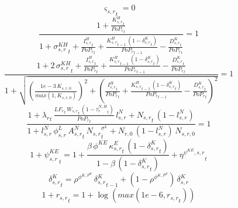 \begin{dmath}
{{\varsigma_{s,r}}}_{t}=0
\end{dmath}
\noindent[name= `LOM capital 4 1']
\begin{dmath}
\frac{1+\frac{{{K^H_{s,r}}}_{t}}{{{PoP_r}}_{t}}}{1+{{\sigma^{KH}_{s,r}}}_{t}+\frac{{{I^H_{s,r}}}_{t}}{{{PoP_r}}_{t}}+\frac{{{K^H_{s,r}}}_{t-1}\, \left(1-{{\delta^{K}_{s,r}}}_{t}\right)}{{{PoP_r}}_{t-1}}-\frac{{{D^K_{s,r}}}_{t}}{{{PoP_r}}_{t}}}=1
\end{dmath}
\noindent[name= `Capital non-negativity slack 4 1']
\begin{dmath}
\frac{1+2\, {{\sigma^{KH}_{s,r}}}_{t}+\frac{{{I^H_{s,r}}}_{t}}{{{PoP_r}}_{t}}+\frac{{{K^H_{s,r}}}_{t-1}\, \left(1-{{\delta^{K}_{s,r}}}_{t}\right)}{{{PoP_r}}_{t-1}}-\frac{{{D^K_{s,r}}}_{t}}{{{PoP_r}}_{t}}}{1+\sqrt{\left(\frac{1e-3\, {{K_{s,r,0}}}}{max(1,{{K_{s,r,0}}})}\right)^{2}+\left(\frac{{{I^H_{s,r}}}_{t}}{{{PoP_r}}_{t}}+\frac{{{K^H_{s,r}}}_{t-1}\, \left(1-{{\delta^{K}_{s,r}}}_{t}\right)}{{{PoP_r}}_{t-1}}-\frac{{{D^K_{s,r}}}_{t}}{{{PoP_r}}_{t}}\right)^{2}}}=1
\end{dmath}
\noindent[name= `FOC labour supply 4 1']
\begin{dmath}
\frac{1+{\lambda_r}_{t}\, \frac{{{LF_r}}_{t}\, {{W_{s,r}}}_{t}\, \left(1-{{\tau^{N,H}_{r}}}_{t}\right)}{{{PoP_r}}_{t}}\, {{l^{N}_{s,r}}}+{{N_{s,r}}}_{t}\, \left(1-{{l^{N}_{s,r}}}\right)}{1+{{l^{N}_{s,r}}}\, {{\phi^{L}_{s,r}}}\, {{A^{N}_{s,r}}}_{t}\, {{N_{s,r}}}_{t}^{{{\sigma^{L}}}}+{{N_{r,0}}}\, \left(1-{{l^{N}_{s,r}}}\right)\, {{N_{s,r,0}}}}=1
\end{dmath}
\noindent[name= `SRI capital rental wedge 4 1']
\begin{dmath}
1+{{\psi^{KE}_{s,r}}}_{t}=1+\frac{{{\beta}}\, {{\phi^{KE}}}\, {{\kappa^{E}_{s,r}}}_{t}\, \left(1-{{\delta^{K}_{s,r}}}_{t}\right)}{1-{{\beta}}\, \left(1-{{\delta^{K}_{s,r}}}_{t}\right)}+{{\eta^{\psi^{KE},s,r}}}_{t}
\end{dmath}
\noindent[name= `delta\_5\_1']
\begin{dmath}
{{\delta^{K}_{s,r}}}_{t}={{\rho^{\phi^{K,P^E}}}}\, {{\delta^{K}_{s,r}}}_{t-1}+\left(1-{{\rho^{\phi^{K,P^E}}}}\right)\, {{\delta^{K}_{s,r}}}
\end{dmath}
\noindent[name= `log household rental rate 5 1']
\begin{dmath}
1+{{r_{s,r}}}_{t}=1+\log\left(max(1e-6,{{r_{s,r}}}_{t})\right)
\end{dmath}
\noindent[name= `FOC household capital 5 1']
